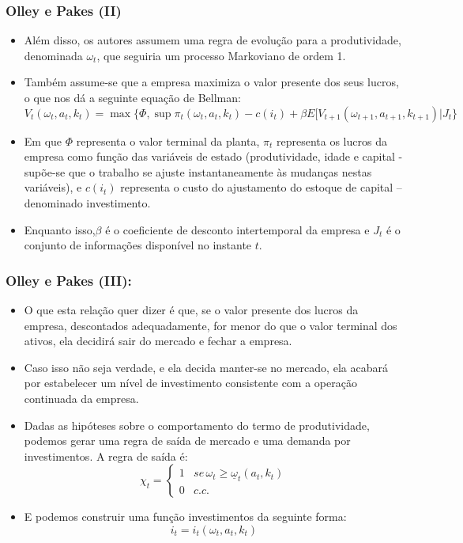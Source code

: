 \documentclass{beamer}
\begin{document}
\begin{frame}\frametitle{Olley e Pakes (II)}

\begin{itemize}
\item Além disso, os autores assumem uma regra de evolução para a produtividade,
denominada $\omega_{t}$, que seguiria um processo Markoviano de ordem
1. 
\item Também assume-se que a empresa maximiza o valor presente dos seus
lucros, o que nos dá a seguinte equação de Bellman:{\small{}
\[
V_{t}(\omega_{t},a_{t},k_{t})=\max\{\Phi,\sup\pi_{t}(\omega_{t},a_{t},k_{t})-c(i_{t})+\beta E[V_{t+1}(\omega_{t+1},a_{t+1},k_{t+1})|J_{t}\}
\]
}{\small \par}
\item Em que $\Phi$ representa o valor terminal da planta, $\pi_{t}$ representa
os lucros da empresa como função das variáveis de estado (produtividade,
idade e capital - supõe-se que o trabalho se ajuste instantaneamente
às mudanças nestas variáveis), e $c(i_{t})$ representa o custo do
ajustamento do estoque de capital -- denominado investimento. 
\item Enquanto isso,$\beta$ é o coeficiente de desconto intertemporal da
empresa e $J_{t}$ é o conjunto de informações disponível no instante
$t$.
\end{itemize}
\end{frame}

\begin{frame}\frametitle{Olley e Pakes (III):}

\begin{itemize}
\item O que esta relação quer dizer é que, se o valor presente dos lucros
da empresa, descontados adequadamente, for menor do que o valor terminal
dos ativos, ela decidirá sair do mercado e fechar a empresa. 
\item Caso isso não seja verdade, e ela decida manter-se no mercado, ela
acabará por estabelecer um nível de investimento consistente com a
operação continuada da empresa. 
\item Dadas as hipóteses sobre o comportamento do termo de produtividade,
podemos gerar uma regra de saída de mercado e uma demanda por investimentos.
A regra de saída é:
\[
\chi_{t}=\begin{cases}
1 & se\,\omega_{t}\geq\underline{\omega}_{t}(a_{t},k_{t})\\
0 & c.c.
\end{cases}
\]
\item E podemos construir uma função investimentos da seguinte forma:
\[
i_{t}=i_{t}(\omega_{t},a_{t},k_{t})
\]
\end{itemize}
\end{frame}
\end{document}
